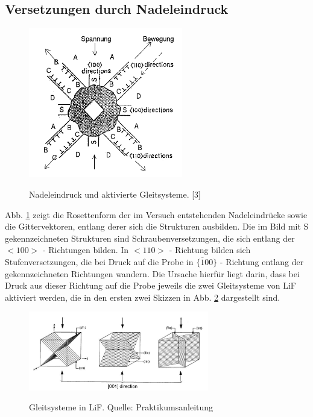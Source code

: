     \subsection{Versetzungen durch Nadeleindruck}
	\begin{figure}[H]
            \centering
            \includegraphics[width=0.6\textwidth]{Images/Question3.PNG}
            \label{FigNadel}
            \caption{Nadeleindruck und aktivierte Gleitsysteme. [3]}
        \end{figure}
	
	Abb. \ref{FigNadel} zeigt die Rosettenform der im Versuch entstehenden Nadeleindrücke sowie die Gittervektoren, entlang derer sich die Strukturen ausbilden. 
	Die im Bild mit S gekennzeichneten Strukturen sind Schraubenversetzungen, die sich entlang der $<100>$ - Richtungen bilden. In $<110>$ - Richtung bilden sich
	Stufenversetzungen, die bei Druck auf die Probe in $\{ \overline{1}00\}$ - Richtung entlang der gekennzeichneten Richtungen wandern. Die Ursache hierfür liegt
	darin, dass bei Druck aus dieser Richtung auf die Probe jeweils die zwei Gleitsysteme von LiF aktiviert werden, die in den ersten zwei Skizzen in Abb. 
	\ref{FigGleitGel} dargestellt sind.
	

	\begin{figure}[H]
            \centering
            \includegraphics[width=0.7\textwidth]{Images/Gleitsysteme.JPG}
            \label{FigGleitGel}
            \caption{Gleitsysteme in LiF. Quelle: Praktikumsanleitung}
        \end{figure}


	
